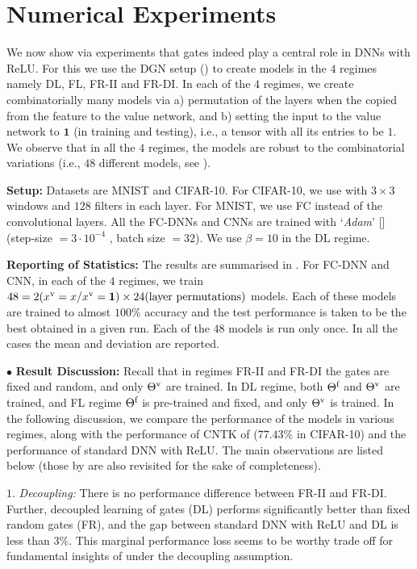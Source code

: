 \section{Numerical Experiments}\label{sec:exp} 
We  now show via experiments that gates indeed play a central role in DNNs with ReLU. For this we use the DGN setup () to create models in the $4$ regimes namely DL, FL, FR-II and FR-DI. In each of the $4$ regimes, we create  combinatorially many models via a) permutation of the layers when the copied from the feature to the value network, and b) setting the input to the value network to $\mathbf{1}$ (in training and testing), i.e., a tensor with all its entries to be $1$. We observe that in all the $4$ regimes, the models are robust to the combinatorial variations (i.e., $48$ different models, see ).

\textbf{Setup:} Datasets are MNIST and CIFAR-10. For CIFAR-10, we use  with $3\times 3$  windows and $128$ filters in each layer. For MNIST, we use FC instead of the convolutional layers.  All the FC-DNNs and CNNs are trained with `\emph{Adam}'  [] (step-size $=3\cdot 10^{-4}$ , batch size $=32$). We use $\beta=10$ in the DL regime.

\textbf{Reporting of Statistics:} The results are summarised in . For FC-DNN and CNN, in each of the $4$ regimes, we train $48= 2 (x^{\text{v}}=x / x^{\text{v}}=\mathbf{1}) \times 24(\text{layer permutations})$ models. Each of these models are trained to almost $100\%$ accuracy and the test performance is taken to be the best obtained in a given run. Each of the $48$ models is run only once. In all the cases the mean and deviation are reported.


$\bullet$ \textbf{Result Discussion:}  Recall that in regimes FR-II and FR-DI the gates are fixed and random, and only ${\Theta}^{\text{v}}$ are trained. In DL regime, both $\Theta^{\textrm{f}}$ and ${\Theta}^{\text{v}}$ are trained, and FL regime $\Theta^{\textrm{f}}$ is pre-trained and fixed, and only ${\Theta}^{\text{v}}$ is trained. In the following discussion, we compare the performance of the models in various regimes, along with the performance of CNTK of \cite{arora2019exact} ($77.43\%$ in CIFAR-10) and the performance of standard DNN with ReLU.  The main observations are listed below (those by \cite{npk} are also revisited for the sake of completeness). 

\indent\quad $1.$ \emph{Decoupling:} There is no performance difference between FR-II and FR-DI.%
Further, decoupled learning of gates (DL) performs significantly better than fixed random gates (FR), and the gap between standard DNN with ReLU and DL is less than $3\%$. This marginal performance loss seems to be worthy trade off for fundamental insights of  under the decoupling assumption.

